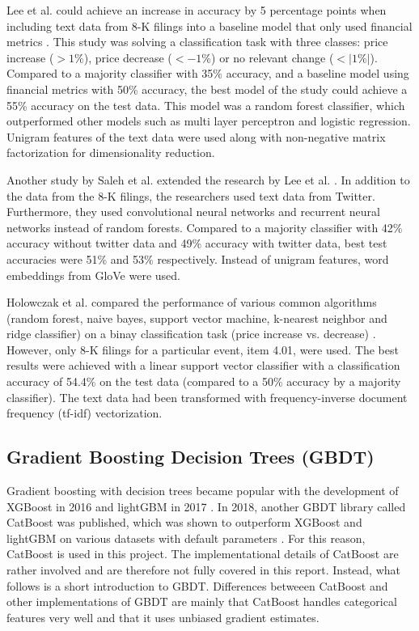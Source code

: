 \documentclass{article}
\begin{document}
	Lee et al. could achieve an increase in accuracy by 5 percentage points when including text data from 8-K filings into a baseline model that only used financial metrics \cite{lee_importance_2014}. This study was solving a classification task with three classes: price increase ($> 1\%$), price decrease ($< -1\%$) or no relevant change ($< |1 \%|$). Compared to a majority classifier with 35\% accuracy, and a baseline model using financial metrics with 50\% accuracy, the best model of the study could achieve a 55\% accuracy on the test data. This model was a random forest classifier, which outperformed other models such as multi layer perceptron and logistic regression. Unigram features of the text data were used along with non-negative matrix factorization for dimensionality reduction.
	
	Another study by Saleh et al. extended the research by Lee et al. \cite{saleh_neural_nodate}. In addition to the data from the 8-K filings, the researchers used text data from Twitter. Furthermore, they used convolutional neural networks and recurrent neural networks instead of random forests. Compared to a majority classifier with 42\% accuracy without twitter data and 49\% accuracy with twitter data, best test accuracies were 51\% and 53\% respectively. Instead of unigram features, word embeddings from GloVe were used.
	
	Holowczak et al. compared the performance of various common algorithms (random forest, naive bayes, support vector machine, k-nearest neighbor and ridge classifier) on a binay classification task (price increase vs. decrease) \cite{holowczak_testing_2019}. However, only 8-K filings for a particular event, item 4.01, were used. The best results were achieved with a linear support vector classifier with a classification accuracy of 54.4\% on the test data (compared to a 50\% accuracy by a majority classifier). The text data had been transformed with frequency-inverse document frequency (tf-idf) vectorization.
	
	
	\subsection{Gradient Boosting Decision Trees (GBDT)}
	
	Gradient boosting with decision trees became popular with the development of XGBoost in 2016 \cite{chen_xgboost:_2016} and lightGBM in 2017 \cite{ke_lightgbm:_2017}. In 2018, another GBDT library called CatBoost was published, which was shown to outperform XGBoost and lightGBM on various datasets with default parameters \cite{dorogush_catboost:_2018}. For this reason, CatBoost is used in this project. The implementational details of CatBoost are rather involved and are therefore not fully covered in this report. Instead, what follows is a short introduction to GBDT. Differences betweeen CatBoost and other implementations of GBDT are mainly that CatBoost handles categorical features very well and that it uses unbiased gradient estimates. 
	
\end{document}
